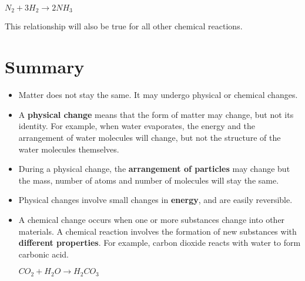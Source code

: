 \begin{center}
\rm${N_{2} + 3H_{2} \rightarrow 2NH_{3}}$
\end{center}

This relationship will also be true for all other chemical reactions. 



\section{Summary}

\begin{itemize}
\item{Matter does not stay the same. It may undergo physical or chemical changes.}
\item{A \textbf{physical change} means that the form of matter may change, but not its identity. For example, when water evaporates, the energy and the arrangement of water molecules will change, but not the structure of the water molecules themselves.}
\item{During a physical change, the \textbf{arrangement of particles} may change but the mass, number of atoms and number of molecules will stay the same.}
\item{Physical changes involve small changes in \textbf{energy}, and are easily reversible.}
\item{A chemical change occurs when one or more substances change into other materials. A chemical reaction involves the formation of new substances with \textbf{different properties}. For example, carbon dioxide reacts with water to form carbonic acid.

\begin{center}
\rm${CO_{2} + H_{2}O \rightarrow H_{2}CO_{3}}$
\end{center}
}


\end{itemize}
